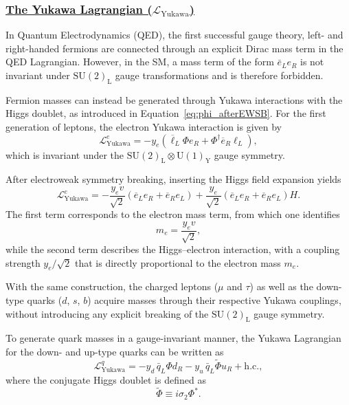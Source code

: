 \subsubsection{\underline{The Yukawa Lagrangian ($\mathcal{L}_{\text{Yukawa}} $)} }

In Quantum Electrodynamics (QED), the first successful gauge theory, left- and right-handed fermions are connected through an explicit Dirac mass term in the QED Lagrangian. 
However, in the SM, a mass term of the form $\bar{e}_L e_R$ is not invariant under $\mathrm{SU}(2)_{\text{L}}$ gauge transformations and is therefore forbidden. 

Fermion masses can instead be generated through Yukawa interactions with the Higgs doublet, as introduced in Equation~\eqref{eq:phi_afterEWSB}. 
For the first generation of leptons, the electron Yukawa interaction is given by
\begin{equation}\label{eq:leg-electron}
    \mathcal{L}_{\text{Yukawa}}^{e}
    =
    -y_{e}\left(\overline{\ell}_{L} \Phi e_{R}
    + \Phi^{\dagger} \overline{e}_{R} \ell_{L}\right),
\end{equation}
which is invariant under the $\mathrm{SU}(2)_{\text{L}} \otimes \mathrm{U}(1)_{\text{Y}}$ gauge symmetry.

After electroweak symmetry breaking, inserting the Higgs field expansion yields
\begin{equation}
\mathcal{L}_{\text{Yukawa}}^{e}
=
-\frac{y_{e} v}{\sqrt{2}}
\left(\overline{e}_{L}e_{R}+\overline{e}_{R} e_{L}\right)
+
\frac{y_{e}}{\sqrt{2}}
\left(\overline{e}_{L} e_{R}+\overline{e}_{R} e_{L}\right) H .
\end{equation}
The first term corresponds to the electron mass term, from which one identifies
\begin{equation}
    m_{e} = \frac{y_{e} v}{\sqrt{2}},
\end{equation}
while the second term describes the Higgs--electron interaction, with a coupling strength $y_{e}/\sqrt{2}$ that is directly proportional to the electron mass $m_e$.

With the same construction, the charged leptons ($\mu$ and $\tau$) as well as the down-type quarks ($d$, $s$, $b$) acquire masses through their respective Yukawa couplings, without introducing any explicit breaking of the $\mathrm{SU}(2)_{\text{L}}$ gauge symmetry.

To generate quark masses in a gauge-invariant manner, the Yukawa Lagrangian for the down- and up-type quarks can be written as
\begin{equation}
    \mathcal{L}_{\text{Yukawa}}^{q}
    =
    - y_d\, \bar{q}_L \Phi d_R
    - y_u\, \bar{q}_L \tilde{\Phi} u_R
    + \text{h.c.},
\end{equation}
where the conjugate Higgs doublet is defined as
\begin{equation}
    \tilde{\Phi} \equiv i \sigma_2 \Phi^{*}.
\end{equation}

